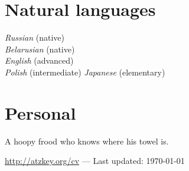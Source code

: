 \documentclass[12pt, a4paper]{article}
\begin{document}
  \section*{Natural languages}
  \textit{Russian} (native)\\
  \textit{Belarusian} (native)\\
  \textit{English} (advanced)\\
  \textit{Polish} (intermediate)
  \textit{Japanese} (elementary)

  \section*{Personal}
  A hoopy frood who knows where his towel is.

  \vfill{}
  \hrulefill
  \begin{center}
    \footnotesize \href{http://atzkey.org/cv}{http://atzkey.org/cv} — Last updated: \today
  \end{center}
\end{document}
